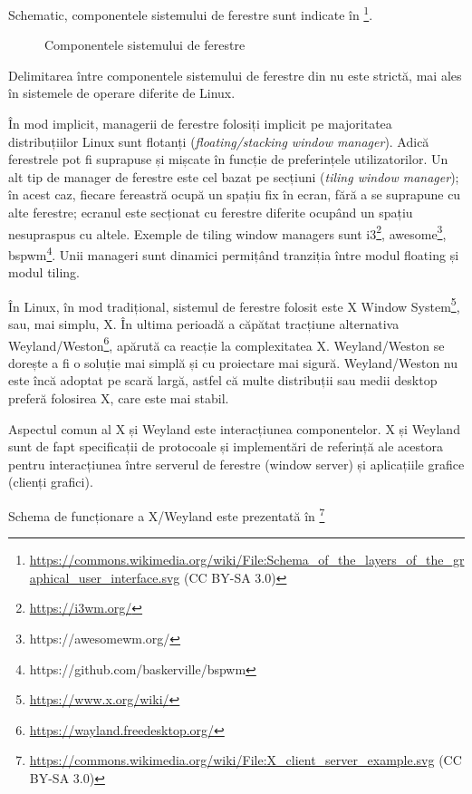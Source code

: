 Schematic, componentele sistemului de ferestre sunt indicate în \footnote{\url{https://commons.wikimedia.org/wiki/File:Schema_of_the_layers_of_the_graphical_user_interface.svg} (CC BY-SA 3.0)}.

\begin{figure}[htbp]
  \centering
  \def\svgwidth{\columnwidth}
  
  \caption{Componentele sistemului de ferestre}
  \label{fig:ui:window-system}
\end{figure}

Delimitarea între componentele sistemului de ferestre din  nu este strictă, mai ales în sistemele de operare diferite de Linux.

În mod implicit, managerii de ferestre folosiți implicit pe majoritatea distribuțiilor Linux sunt flotanți (\textit{floating/stacking window manager}). Adică ferestrele pot fi suprapuse și mișcate în funcție de preferințele utilizatorilor. Un alt tip de manager de ferestre este cel bazat pe secțiuni (\textit{tiling window manager}); în acest caz, fiecare fereastră ocupă un spațiu fix în ecran, fără a se suprapune cu alte ferestre; ecranul este secționat cu ferestre diferite ocupând un spațiu nesupraspus cu altele. Exemple de tiling window managers sunt i3\footnote{\url{https://i3wm.org/}}, awesome\footnote{https://awesomewm.org/}, bspwm\footnote{https://github.com/baskerville/bspwm}. Unii manageri sunt dinamici permițând tranziția între modul floating și modul tiling.

În Linux, în mod tradițional, sistemul de ferestre folosit este X Window System\footnote{\url{https://www.x.org/wiki/}}, sau, mai simplu, X. În ultima perioadă a căpătat tracțiune alternativa Weyland/Weston\footnote{\url{https://wayland.freedesktop.org/}}, apărută ca reacție la complexitatea X. Weyland/Weston se dorește a fi o soluție mai simplă și cu proiectare mai sigură. Weyland/Weston nu este încă adoptat pe scară largă, astfel că multe distribuții sau medii desktop preferă folosirea X, care este mai stabil.

Aspectul comun al X și Weyland este interacțiunea componentelor. X și Weyland sunt de fapt specificații de protocoale și implementări de referință ale acestora pentru interacțiunea între serverul de ferestre (window server) și aplicațiile grafice (clienți grafici).

Schema de funcționare a X/Weyland este prezentată în \footnote{\url{https://commons.wikimedia.org/wiki/File:X_client_server_example.svg} (CC BY-SA 3.0)}

